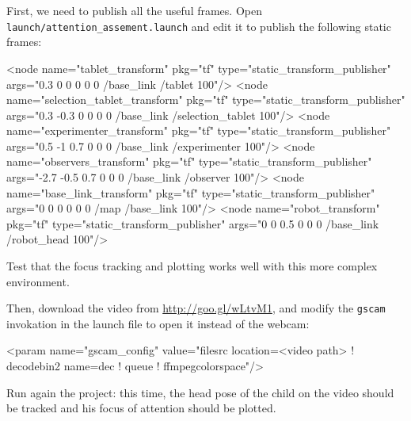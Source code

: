 \documentclass{instructions}
\begin{document}
First, we need to publish all the useful frames. Open {\tt
launch/attention\_assement.launch} and edit it to publish the following static
frames:

\begin{xmlcode}
<node name="tablet_transform" pkg="tf" type="static_transform_publisher" 
                                                args="0.3 0 0 0 0 0 /base_link /tablet 100"/>
<node name="selection_tablet_transform" pkg="tf" type="static_transform_publisher"
                                   args="0.3 -0.3 0 0 0 0 /base_link /selection_tablet 100"/>
<node name="experimenter_transform" pkg="tf" type="static_transform_publisher"
                                       args="0.5 -1 0.7 0 0 0 /base_link /experimenter 100"/>
<node name="observers_transform" pkg="tf" type="static_transform_publisher"
                                        args="-2.7 -0.5 0.7 0 0 0 /base_link /observer 100"/>
<node name="base_link_transform" pkg="tf" type="static_transform_publisher"
                                                     args="0 0 0 0 0 0 /map /base_link 100"/>
<node name="robot_transform" pkg="tf" type="static_transform_publisher" 
                                            args="0 0 0.5 0 0 0 /base_link /robot_head 100"/>
\end{xmlcode}

Test that the focus tracking and plotting works well with this more complex
environment.

Then, download the video from \url{http://goo.gl/wLtvM1}, and modify the {\tt gscam}
invokation in the launch file to open it instead of the webcam:

\begin{xmlcode}
    <param name="gscam_config"
      value="filesrc location=<video path> ! decodebin2 name=dec ! queue ! ffmpegcolorspace"/>
\end{xmlcode}

Run again the project: this time, the head pose of the child on the video should
be tracked and his focus of attention should be plotted.


\end{document}
